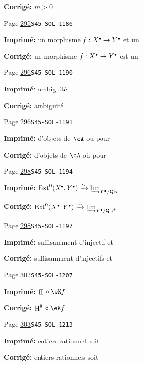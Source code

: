 \documentclass[oneside]{book}
\DeclareMathOperator{\ext}{Ext}
\DeclareMathOperator{\h}{H}
\newcommand{\iso}{\xrightarrow\sim}
\theoremstyle{sga-source}
\theoremstyle{sga-source-dash}
\theoremstyle{sga-source-dotdash}
\theoremstyle{sga-source-number-note-dash}
\theoremstyle{sga-source-note-number-dotdash}
\theoremstyle{sga-source-example-dotdash}
\theoremstyle{sga-source-inline-number}
\theoremstyle{sga-source-bare-number}
\theoremstyle{sga-source}
\let\oldbullet\bullet
\renewcommand{\bullet}{\textnormal{\tiny$\oldbullet$}}
\begin{document}
\begin{description}
\par\noindent\textbf{Corrigé:} $m>0$
\smallskip
\item[\hypertarget{apparatus:FR-0297}{297}] Page \hyperlink{printpage:fr:295}{295}\quad\texttt{S45-SOL-1186}
\par\noindent\textbf{Imprimé:} un morphisme $f:X^\bullet \to Y^\bullet$ et un
\par\noindent\textbf{Corrigé:} un morphisme $f:X^\bullet \to Y^\bullet$ est un
\smallskip
\item[\hypertarget{apparatus:FR-0298}{298}] Page \hyperlink{printpage:fr:296}{296}\quad\texttt{S45-SOL-1190}
\par\noindent\textbf{Imprimé:} ambiguité
\par\noindent\textbf{Corrigé:} ambiguïté
\smallskip
\item[\hypertarget{apparatus:FR-0299}{299}] Page \hyperlink{printpage:fr:296}{296}\quad\texttt{S45-SOL-1191}
\par\noindent\textbf{Imprimé:} d'objets de $\cA$ ou pour
\par\noindent\textbf{Corrigé:} d'objets de $\cA$ où pour
\smallskip
\item[\hypertarget{apparatus:FR-0300}{300}] Page \hyperlink{printpage:fr:298}{298}\quad\texttt{S45-SOL-1194}
\par\noindent\textbf{Imprimé:} \(\ext^0(X^\bullet,Y^\bullet) \iso \varinjlim_{Y^\bullet/\mathsf{Qis}}\)
\par\noindent\textbf{Corrigé:} \(\ext^0(X^\bullet,Y^\bullet) \iso \varinjlim_{Y^\bullet/\mathsf{Qis}^+}\)
\smallskip
\item[\hypertarget{apparatus:FR-0301}{301}] Page \hyperlink{printpage:fr:298}{298}\quad\texttt{S45-SOL-1197}
\par\noindent\textbf{Imprimé:} suffisamment d'injectif et
\par\noindent\textbf{Corrigé:} suffisamment d'injectifs et
\smallskip
\item[\hypertarget{apparatus:FR-0302}{302}] Page \hyperlink{printpage:fr:302}{302}\quad\texttt{S45-SOL-1207}
\par\noindent\textbf{Imprimé:} \(\h{}\circ \eK f\)
\par\noindent\textbf{Corrigé:} \(\h^0{}\circ \eK f\)
\smallskip
\item[\hypertarget{apparatus:FR-0303}{303}] Page \hyperlink{printpage:fr:303}{303}\quad\texttt{S45-SOL-1213}
\par\noindent\textbf{Imprimé:} entiers rationnel soit
\par\noindent\textbf{Corrigé:} entiers rationnels soit

\end{description}
\end{document}
